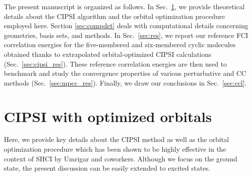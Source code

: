 \documentclass[aip,jcp,reprint,noshowkeys,superscriptaddress,floatfix]{revtex4-1}
\begin{document}
The present manuscript is organized as follows.
In Sec.~\ref{sec:OO-CIPSI}, we provide theoretical details about the CIPSI algorithm and the orbital optimization procedure employed here.
Section \ref{sec:compdet} deals with computational details concerning geometries, basis sets, and methods.
In Sec.~\ref{sec:res}, we report our reference FCI correlation energies for the five-membered and six-membered cyclic molecules obtained thanks to extrapolated orbital-optimized CIPSI calculations (Sec.~\ref{sec:cipsi_res}).
These reference correlation energies are then used to benchmark and study the convergence properties of various perturbative and CC methods (Sec.~\ref{sec:mpcc_res}).
Finally, we draw our conclusions in Sec.~\ref{sec:ccl}.

\section{CIPSI with optimized orbitals}
\label{sec:OO-CIPSI}

Here, we provide key details about the CIPSI method \cite{Huron_1973,Garniron_2019} as well as the orbital optimization procedure which has been shown to be highly effective in the context of SHCI by Umrigar and coworkers. \cite{Eriksen_2020,Yao_2020,Yao_2021}
Although we focus on the ground state, the present discussion can be easily extended to excited states. \cite{Scemama_2019,Veril_2021}
\end{document}
